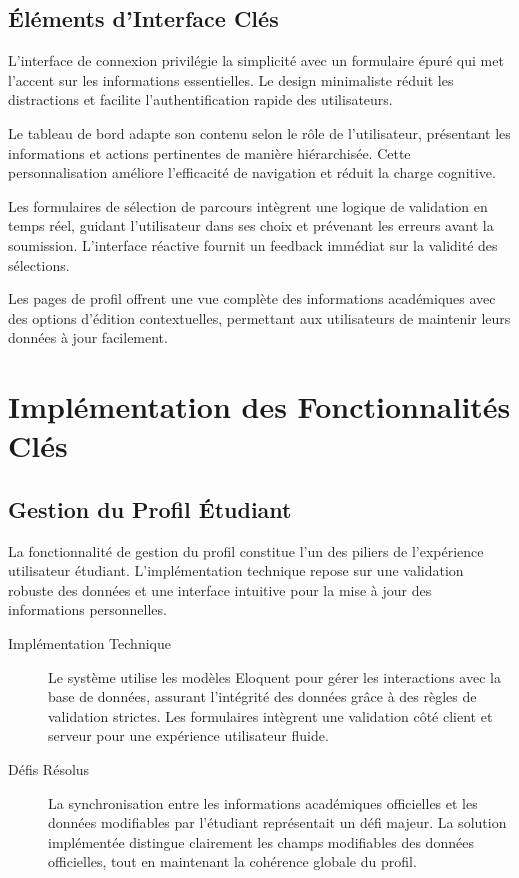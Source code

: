 \documentclass[12pt,a4paper]{report}
\begin{document}
\subsection{Éléments d'Interface Clés}

L'interface de connexion privilégie la simplicité avec un formulaire épuré qui met l'accent sur les informations essentielles. Le design minimaliste réduit les distractions et facilite l'authentification rapide des utilisateurs.

Le tableau de bord adapte son contenu selon le rôle de l'utilisateur, présentant les informations et actions pertinentes de manière hiérarchisée. Cette personnalisation améliore l'efficacité de navigation et réduit la charge cognitive.

Les formulaires de sélection de parcours intègrent une logique de validation en temps réel, guidant l'utilisateur dans ses choix et prévenant les erreurs avant la soumission. L'interface réactive fournit un feedback immédiat sur la validité des sélections.

Les pages de profil offrent une vue complète des informations académiques avec des options d'édition contextuelles, permettant aux utilisateurs de maintenir leurs données à jour facilement.

\section{Implémentation des Fonctionnalités Clés}

\subsection{Gestion du Profil Étudiant}

La fonctionnalité de gestion du profil constitue l'un des piliers de l'expérience utilisateur étudiant. L'implémentation technique repose sur une validation robuste des données et une interface intuitive pour la mise à jour des informations personnelles.

\begin{description}
\item[Implémentation Technique] Le système utilise les modèles Eloquent pour gérer les interactions avec la base de données, assurant l'intégrité des données grâce à des règles de validation strictes. Les formulaires intègrent une validation côté client et serveur pour une expérience utilisateur fluide.

\item[Défis Résolus] La synchronisation entre les informations académiques officielles et les données modifiables par l'étudiant représentait un défi majeur. La solution implémentée distingue clairement les champs modifiables des données officielles, tout en maintenant la cohérence globale du profil.
\end{description}
\end{document}
